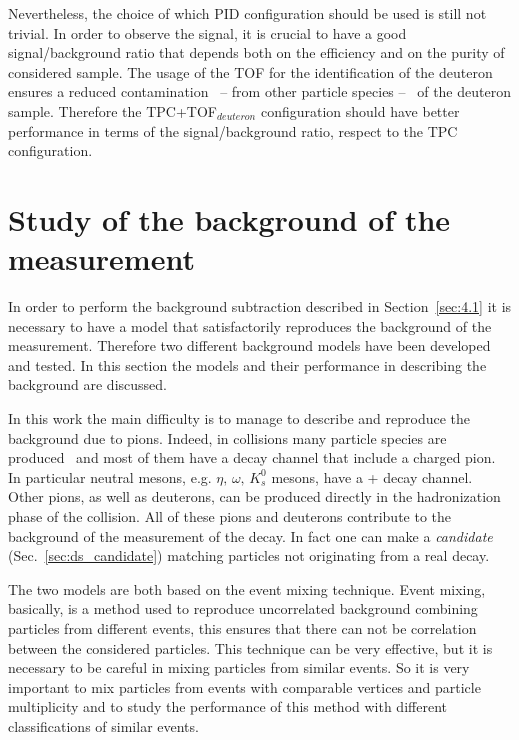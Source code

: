 Nevertheless, the choice of which PID configuration should be used is still not trivial. 
In order to observe the \ds signal, it is crucial to have a good signal/background ratio that depends
both on the efficiency and on the purity of considered sample.
The usage of the TOF for the identification of the deuteron ensures a reduced contamination \ -- from 
other particle species -- \ of the deuteron sample. 
Therefore the TPC+TOF$_{deuteron}$ configuration should have better performance in terms of the 
signal/background ratio, respect to the TPC configuration.

%
%
\section{Study of the background of the measurement} \label{sec:background}

In order to perform the background subtraction described in Section~\ref{sec:4.1} it is necessary to have
a model that satisfactorily reproduces the background of the measurement. 
Therefore two different background models have been developed and tested. 
In this section the models and their performance in describing the background are discussed.

In this work the main difficulty is to manage to describe and reproduce the background due to pions.
Indeed, in \pPb collisions many particle species are produced~\cite{pkp_prod, neutralp, k0s_prod} 
and most of them have a decay channel that include a charged pion.
In particular neutral mesons, e.g. $\eta,\,\omega,\,K_{s}^{0}$ mesons, have a 
\pip + \pim decay channel. Other pions, as well as deuterons, can be produced directly
in the hadronization phase of the collision.
All of these pions and deuterons contribute to the background of the measurement of the
\dstdecay decay. In fact one can make a \textit{\ds candidate} (Sec.~\ref{sec:ds_candidate})
matching particles not originating from a real \ds decay.

The two models are both based on the event mixing technique.
Event mixing, basically, is a method used to reproduce uncorrelated background combining particles from
different events, this ensures that there can not be correlation between the considered particles.
This technique can be very effective, but it is necessary to be careful in mixing particles from 
similar events.
So it is very important to mix particles from events with comparable vertices and particle multiplicity 
and to study the performance of this method with different classifications of similar events.

